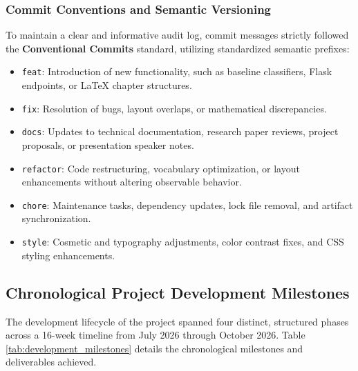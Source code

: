 \subsubsection{Commit Conventions and Semantic Versioning}
To maintain a clear and informative audit log, commit messages strictly followed the \textbf{Conventional Commits} standard, utilizing standardized semantic prefixes:
\begin{itemize}
    \item \texttt{feat}: Introduction of new functionality, such as baseline classifiers, Flask endpoints, or LaTeX chapter structures.
    \item \texttt{fix}: Resolution of bugs, layout overlaps, or mathematical discrepancies.
    \item \texttt{docs}: Updates to technical documentation, research paper reviews, project proposals, or presentation speaker notes.
    \item \texttt{refactor}: Code restructuring, vocabulary optimization, or layout enhancements without altering observable behavior.
    \item \texttt{chore}: Maintenance tasks, dependency updates, lock file removal, and artifact synchronization.
    \item \texttt{style}: Cosmetic and typography adjustments, color contrast fixes, and CSS styling enhancements.
\end{itemize}

\subsection{Chronological Project Development Milestones}

The development lifecycle of the project spanned four distinct, structured phases across a 16-week timeline from July 2026 through October 2026. Table \ref{tab:development_milestones} details the chronological milestones and deliverables achieved.

